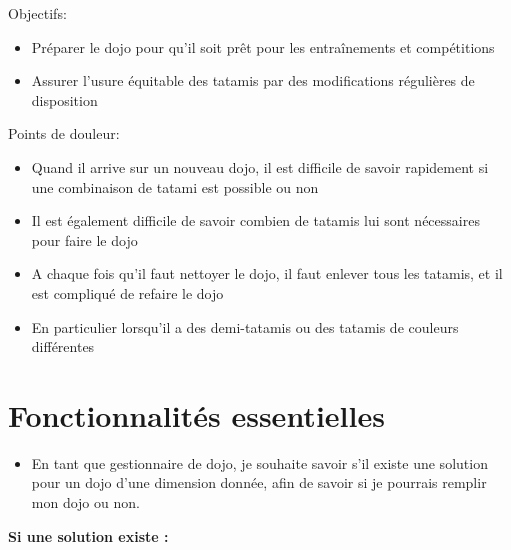 Objectifs:
\begin{itemize}
    \item Préparer le dojo pour qu’il soit prêt pour les entraînements et compétitions
    \item Assurer l’usure équitable des tatamis par des modifications régulières de disposition
\end{itemize}

Points de douleur:
\begin{itemize}
    \item Quand il arrive sur un nouveau dojo, il est difficile de savoir rapidement si une 
    combinaison de tatami est possible ou non
    \item Il est également difficile de savoir combien de tatamis lui sont nécessaires pour 
    faire le dojo
    \item A chaque fois qu’il faut nettoyer le dojo, il faut enlever tous les tatamis, et 
    il est compliqué de refaire le dojo
    \item En particulier lorsqu’il a des demi-tatamis ou des tatamis de couleurs différentes

\end{itemize}



\section{Fonctionnalités essentielles}


\begin{itemize}
    \item En tant que gestionnaire de dojo, je souhaite savoir s’il existe une solution pour
     un dojo d'une dimension donnée, afin de savoir si je pourrais remplir mon dojo ou non.
\end{itemize}


\textbf{ Si une solution existe :}

